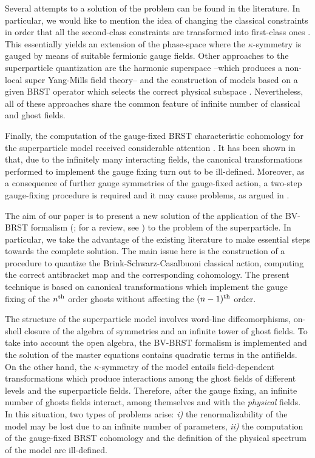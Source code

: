 \documentclass[a4paper,12pt]{article}
\begin{document}
Several attempts to a solution of the problem can be found in the
literature. In particular, we would like to mention the idea of
changing the classical constraints in order that all the second-class
constraints are transformed into first-class ones \cite{GH,ilk}. This
essentially yields an extension of the phase-space where the
$\kappa$-symmetry is gauged by means of suitable fermionic gauge
fields.  Other approaches to the superparticle quantization are the
harmonic superspace \cite{harmo} --which produces a non-local super
Yang-Mills field theory-- and the construction of models based on a
given BRST operator which selects the correct physical subspace
\cite{kallosh}.  Nevertheless, all of these approaches share the
common feature of infinite number of classical and ghost fields.

Finally, the computation of the gauge-fixed BRST characteristic
cohomology \cite{anti_coho,barnich} for the superparticle model
received considerable attention
\cite{kallosh,Lindstrom_BS,Lindstrom,Bastianelli}. It has been shown
in \cite{Bastianelli} that, due to the infinitely many interacting
fields, the canonical transformations performed to implement the gauge
fixing turn out to be ill-defined.  Moreover, as a consequence of
further gauge symmetries of the gauge-fixed action, a two-step
gauge-fixing procedure is required and it may cause problems, as
argued in \cite{kallosh}.

The aim of our paper is to present a new solution of the application
of the BV-BRST formalism (\cite{BRST,BV}; for a review, see
\cite{henneaux,cano,gomis}) to the
problem of the superparticle. In particular, we take the advantage of
the existing literature to make essential steps towards the complete
solution. The main issue here is the construction of a procedure to
quantize the Brink-Schwarz-Casalbuoni classical action, computing the
correct antibracket map and the corresponding cohomology. The present
technique is based on canonical transformations which implement the
gauge fixing of the $n^{\rm th}$ order ghosts without affecting the
$(n-1)^{\rm th}$ order.

The structure of the superparticle model involves word-line
diffeomorphisms, on-shell closure of the algebra of symmetries and an
infinite tower of ghost fields. To take into account the open algebra,
the BV-BRST formalism is implemented and the solution of the master
equations contains quadratic terms in the antifields. On the other
hand, the $\kappa$-symmetry of the model entails field-dependent
transformations which produce interactions among the ghost fields of
different levels and the superparticle fields. Therefore, after the
gauge fixing, an infinite number of ghosts fields interact, among
themselves and with the {\it physical} fields.  In this situation, two
types of problems arise: {\it i)} the renormalizability of the model
may be lost due to an infinite number of parameters, {\it ii)} the
computation of the gauge-fixed BRST cohomology and the definition of
the physical spectrum of the model are ill-defined.
\end{document}
